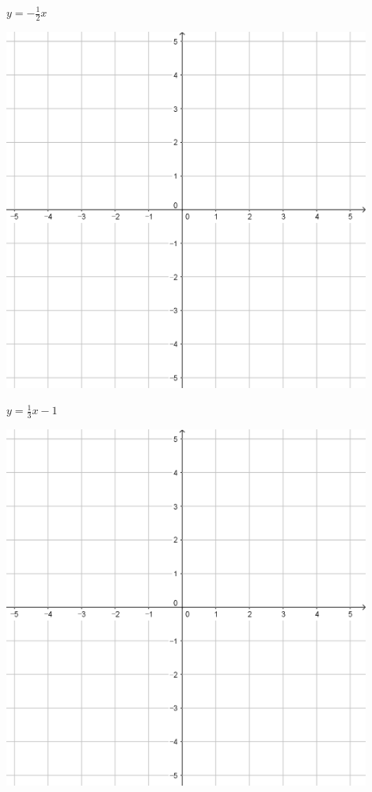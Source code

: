 \documentclass[a4paper]{oblivoir}
\begin{document}
\begin{minipage}{0.45\textwidth}\centering
\(y=-\frac12x\)
\par\bigskip\includegraphics[width=0.9\textwidth]{55}
\end{minipage}
\begin{minipage}{0.45\textwidth}\centering
\(y=\frac13x-1\)
\par\bigskip\includegraphics[width=0.9\textwidth]{55}
\end{minipage}\bigskip\bigskip\par
\end{document}
